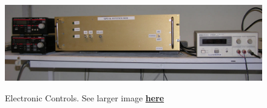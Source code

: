 \documentclass{../lab}
\begin{document}
\begin{figure}[hb]
\centering
\begin{minipage}{0.7\textwidth}
    \href{http://experimentationlab.berkeley.edu/sites/default/files/images/OTZ_Controls_0142B.jpg}{\includegraphics[width=\linewidth,keepaspectratio]{images/OTZ_Controls_0142B.jpg}}
    \caption{Electronic Controls. See larger image \href{http://experimentationlab.berkeley.edu/sites/default/files/images/OTZ_Controls_0142B.jpg}{\textbf{here}}}
\end{minipage}
\end{figure}
\end{document}
